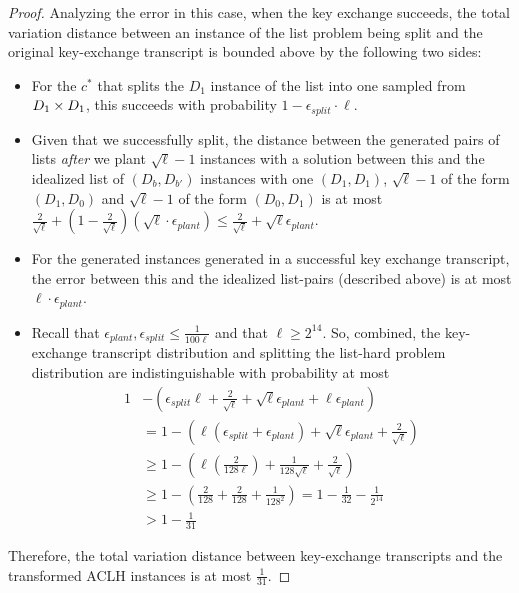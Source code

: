 \begin{proof}
	Analyzing the error in this case, when the key exchange succeeds, the total variation distance between an instance of the list problem being split and the original key-exchange transcript is bounded above by the following two sides:
	\begin{itemize}
		\item For the $c^*$ that splits the $D_1$ instance of the list into one sampled from $D_1 \times D_1$, this succeeds with probability $1 - \epsilon_{split} \cdot \ell$.
		\item Given that we successfully split, the distance between the generated pairs of lists \emph{after} we plant $\sqrt{\ell} - 1$ instances with a solution between this and the idealized list of $(D_b, D_{b'})$ instances with one $(D_1, D_1)$, $\sqrt{\ell} - 1$ of the form $(D_1, D_0)$ and $\sqrt{\ell}-1$ of the form $(D_0, D_1)$ is at most $\frac{2}{\sqrt \ell} + (1 - \frac 2 {\sqrt \ell})(\sqrt \ell \cdot \epsilon_{plant}) \le \frac{2}{\sqrt \ell} + \sqrt{\ell}\epsilon_{plant}$.
		\item For the generated instances generated in a successful key exchange transcript, the error between this and the idealized list-pairs (described above) is at most $\ell \cdot \epsilon_{plant}$.
		\item Recall that $\epsilon_{plant}, \epsilon_{split} \le \frac{1}{100 \ell}$ and that $\ell \ge 2^{14}$. So, combined, the key-exchange transcript distribution and splitting the list-hard problem distribution are indistinguishable with probability at most
		\begin{align*}
		1 &- (\epsilon_{split} \ell  + \frac{2}{\sqrt \ell} + \sqrt{\ell} \epsilon_{plant} + \ell \epsilon_{plant})\\
		&= 1 - (\ell(\epsilon_{split} + \epsilon_{plant}) + \sqrt{\ell} \epsilon_{plant} + \frac{2}{\sqrt \ell})\\
		&\ge 1 - (\ell(\frac 2 {128 \ell}) + \frac{1}{128 \sqrt \ell} + \frac 2 {\sqrt \ell})\\
		&\ge 1 - (\frac{2}{128} + \frac{2}{128} + \frac{1}{128^2}) = 1 - \frac{1}{32} - \frac{1}{2^{14}}\\
		&> 1 - \frac{1}{31}
		\end{align*}
	\end{itemize}
	Therefore, the total variation distance between key-exchange transcripts and the transformed ACLH instances is at most $\frac 1 {31}$.
	

\end{proof}
